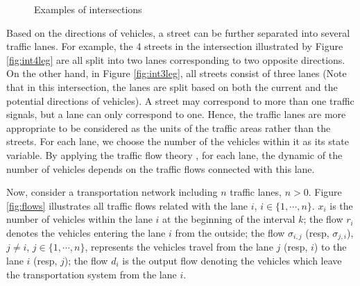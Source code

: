 \documentclass[trsc,nonblindrev]{informs3} %
\begin{document}
\begin{figure}[ht]
  \centering
  \quad
  \caption{Examples of intersections}
\end{figure}

Based on the directions of vehicles, a street can be further
separated into several traffic lanes. For example, the 4 streets in
the intersection illustrated by Figure \ref{fig:int4leg} are all
split into two lanes corresponding to two opposite directions. On the
other hand, in Figure \ref{fig:int3leg}, all streets  consist of
three lanes (Note that in this intersection, the lanes are split
based on both the current and the potential directions of vehicles).
A street may correspond to more than one traffic signals, but a lane
can only correspond to one. Hence, the traffic lanes are more
appropriate to be considered as the units of the traffic areas
rather than  the streets. For each lane, we choose the number of the
vehicles within it as its state variable. By applying the traffic
flow theory \citep{nathan_h_gartner_revised_2005}, for each lane, the
dynamic of the number of vehicles depends on the traffic flows
connected with this lane.

Now, consider a transportation network including $n$ traffic lanes,
$n>0$. Figure \ref{fig:flows} illustrates all traffic flows related
with the lane $i$, $i\in\{1,\cdots,n\}$. $x_i$ is the number of
vehicles within the lane $i$ at the
beginning of the interval $k$; the flow $r_i$ denotes the vehicles
entering the lane $i$ from the outside; the flow $\sigma_{i,j}$
(resp, $\sigma_{j,i}$), $j\neq i$, $j\in\{1,\cdots,n\}$, represents
the vehicles travel from the lane $j$ (resp, $i$) to the lane $i$
(resp, $j$); the flow $d_{i}$ is the output flow denoting the
vehicles which leave the transportation system from the lane $i$.
\end{document}
